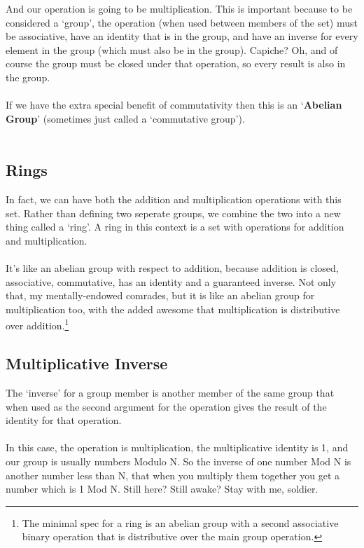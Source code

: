     And our operation is going to be multiplication. This is important because to be considered a `group', the operation (when used between members of the set) must be associative, have an identity that is in the group, and have an inverse for every element in the group (which must also be in the group). Capiche? Oh, and of course the group must be closed under that operation, so every result is also in the group.\\
    \\
    If we have the extra special benefit of commutativity then this is an `\textbf{Abelian Group}' (sometimes just called a `commutative group').\\
    \\
    \subsection{Rings}
    In fact, we can have both the addition and multiplication operations with this set. Rather than defining two seperate groups, we combine the two into a new thing called a `ring'.
    A ring in this context is a set with operations for addition and multiplication.\\
    \\
    It's like an abelian group with respect to addition, because addition is closed, associative, commutative, has an identity and a guaranteed inverse. Not only that, my mentally-endowed comrades, but it is like an abelian group for multiplication too, with the added awesome that multiplication is distributive over addition.\footnote{The minimal spec for a ring is an abelian group with a second associative binary operation that is distributive over the main group operation.}\\

    \subsection{Multiplicative Inverse}
    The `inverse' for a group member is another member of the same group that when used as the second argument for the operation gives the result of the identity for that operation.\\
    \\
    In this case, the operation is multiplication, the multiplicative identity is 1, and our group is usually numbers Modulo N. So the inverse of one number Mod N is another number less than N, that when you multiply them together you get a number which is 1 Mod N. Still here? Still awake? Stay with me, soldier.
    
